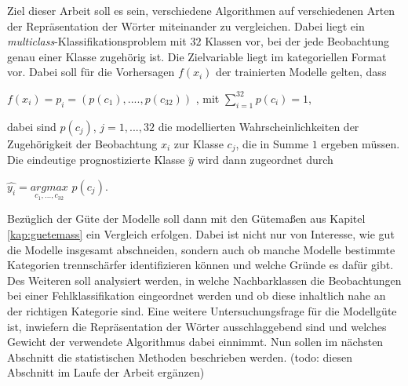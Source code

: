 \documentclass[a4paper,11pt]{article}
\begin{document}
Ziel dieser Arbeit soll es sein, verschiedene Algorithmen auf verschiedenen Arten der Repräsentation der Wörter miteinander zu vergleichen. Dabei liegt ein \textit{multiclass}-Klassifikations\-problem mit $32$ Klassen vor, bei der jede Beobachtung genau einer Klasse zugehörig ist. Die Zielvariable liegt im kategoriellen Format vor. Dabei soll für die Vorhersagen $f(x_i)$ der trainierten Modelle gelten, dass
\begin{center}
$f(x_i) = p_i = (p(c_1), ...., p(c_{32}))$ \hspace{2cm} , mit $\sum\limits_{i = 1}^{32} p(c_i) = 1 $,
\end{center}
dabei sind $p(c_j)$, $j = 1,...,32$ die modellierten Wahrscheinlichkeiten der Zugehörigkeit der Beobachtung $x_i$ zur Klasse $c_j$, die in Summe $1$ ergeben müssen. Die eindeutige prognostizierte Klasse $\hat{y}$ wird dann zugeordnet durch 
\begin{center}
    $\hat{y_i} =  \underset{c_1,...,c_{32}}{argmax}$ $p(c_j)$.
\end{center}

Bezüglich der Güte der Modelle soll dann mit den Gütemaßen aus Kapitel \ref{kap:guetemass} ein Vergleich erfolgen. Dabei ist nicht nur von Interesse, wie gut die Modelle insgesamt abschneiden, sondern auch ob manche Modelle bestimmte Kategorien trennschärfer identifizieren können und welche Gründe es dafür gibt. Des Weiteren soll analysiert werden, in welche Nachbarklassen die Beobachtungen bei einer Fehlklassifikation eingeordnet werden und ob diese inhaltlich nahe an der richtigen Kategorie sind. Eine weitere Untersuchungsfrage für die Modellgüte ist, inwiefern die Repräsentation der Wörter ausschlaggebend sind und welches Gewicht der verwendete Algorithmus dabei einnimmt.
Nun sollen im nächsten Abschnitt die statistischen Methoden beschrieben werden.
(todo: diesen Abschnitt im Laufe der Arbeit ergänzen)

\newpage
\end{document}
